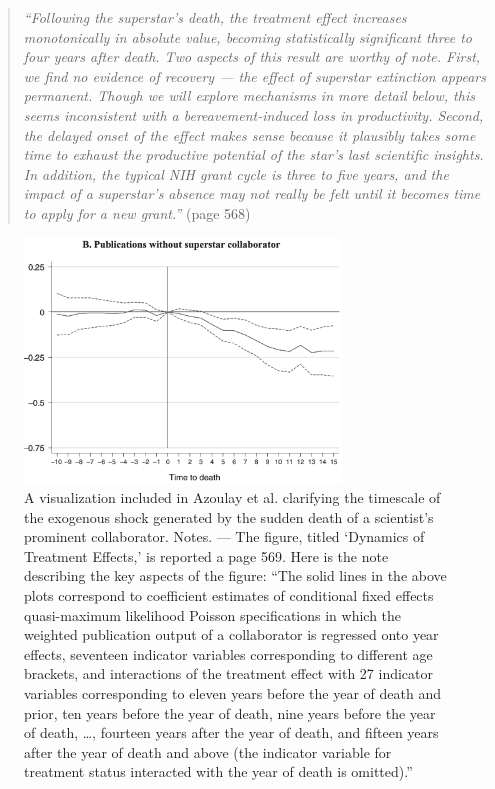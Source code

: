 \begin{refsection}
\begin{quote}
  \textit{
    ``Following the superstar's death, the treatment effect increases
    monotonically in absolute value, becoming statistically significant three to
    four years after death. Two aspects of this result are worthy of note.
    First, we find no evidence of recovery --- the effect of superstar extinction
    appears permanent. Though we will explore mechanisms in more detail below,
    this seems inconsistent with a bereavement-induced loss in productivity.
    Second, the delayed onset of the effect makes sense because it plausibly
    takes some time to exhaust the productive potential of the star's last
    scientific insights. In addition, the typical NIH grant cycle is three to five
    years, and the impact of a superstar's absence may not really be felt until
    it becomes time to apply for a new grant.''
  }
  (page 568)
\end{quote}

\begin{figure}[!htbp]
    \begin{center}
      \includegraphics[width=0.75\textwidth]{exhibits/from_azoulay_et_al_2010.png}
    \end{center}
    \caption{A visualization included in Azoulay et al. 
    \autocite*[][]{azoulay_et_al_2010} clarifying the timescale of the 
    exogenous shock generated by the sudden death of a scientist's prominent
    collaborator. Notes. --- The figure, titled `Dynamics of Treatment Effects,'
    is reported a page 569. Here is the note describing the key aspects of the
    figure: ``The solid lines in the above plots correspond to coefficient
    estimates of conditional fixed effects quasi-maximum likelihood
    Poisson specifications in which the weighted publication output of a
    collaborator is regressed onto year effects, seventeen indicator
    variables corresponding to different age brackets, and interactions of the
    treatment effect with 27 indicator variables corresponding to eleven
    years before the year of death and prior, ten years before the year of death,
    nine years before the year of death, \ldots, fourteen years after the year of
    death, and fifteen years after the year of death and above (the indicator
    variable for treatment status interacted with the year of death is
    omitted).''}
    \label{fig:azoulay_et_al_2010}
\end{figure}


\end{refsection}
